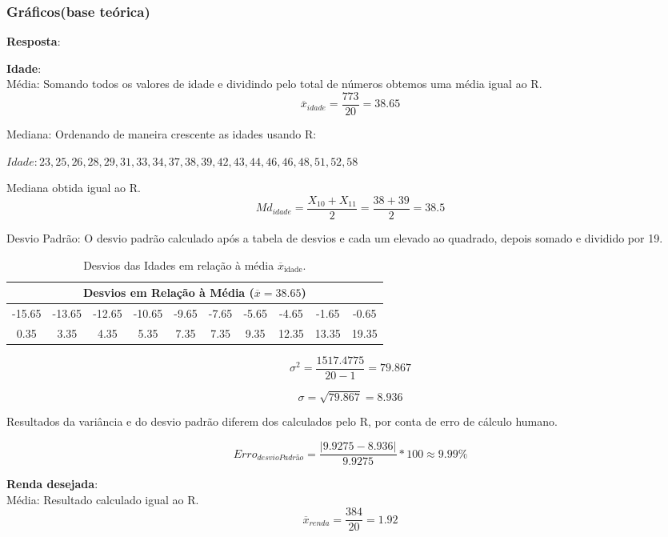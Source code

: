 \documentclass[a4paper,11pt]{article}
\begin{document}
\subsubsection*{Gráficos(base teórica)} 


\begin{description}[leftmargin=*]

\item[2.1] \textbf{Resposta}:

\item \textbf{Idade}: \\
Média:
Somando todos os valores de idade e dividindo pelo total de números obtemos uma média igual ao R.
\[\overline{x}_{idade} = \frac{773}{20} = 38.65\]

Mediana:
Ordenando de maneira crescente as idades usando R:

$Idade: 23, 25, 26, 28, 29, 31, 33, 34, 37, 38, 39, 42, 43, 44, 46, 46, 48, 51, 52, 58$

Mediana obtida igual ao R.
\[Md_{idade} = \frac{X_{10}+X_{11}}{2} = \frac{38+39}{2} =38.5\]


Desvio Padrão:
O desvio padrão calculado após a tabela de desvios e cada um elevado ao quadrado, depois somado e dividido por 19.
\begin{table}[H]
    \centering
    \begin{tabular}{cccccccccc}
        \hline
        \multicolumn{10}{c}{\textbf{Desvios em Relação à Média ($\overline{x} = 38.65$)}}\\
        \hline
        -15.65 & -13.65 & -12.65 & -10.65 & -9.65 & -7.65 & -5.65 & -4.65 & -1.65 & -0.65 \\ 
         0.35 & 3.35 & 4.35 & 5.35 & 7.35 & 7.35 & 9.35 & 12.35 & 13.35 & 19.35 \\
        \hline
    \end{tabular}
    \caption{Desvios das Idades em relação à média $\overline{x}_{\text{idade}}$.}
    \label{tab:desvios_idade}
\end{table}

\[\sigma^2 = \frac{ 1517.4775}{20-1} = 79.867\]

\[\sigma = \sqrt{79.867} = 8.936\]

Resultados da variância e do desvio padrão diferem dos calculados pelo R, por conta de erro de cálculo humano.

\[Erro_{desvioPadrão} = \frac{|9.9275 - 8.936|}{9.9275} * 100  \approx  9.99\%\]



\item \textbf{Renda desejada}:\\
Média:
Resultado calculado igual ao R.
\[\overline{x}_{renda} = \frac{384}{20} = 1.92\]


\end{description}
\end{document}
